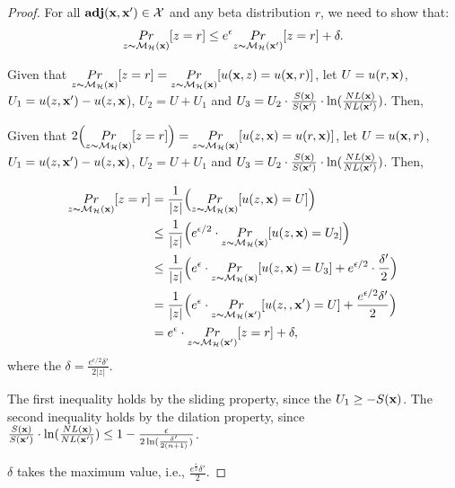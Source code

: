 \documentclass{article}
\begin{document}
\begin{proof}

For all $\textbf{adj}(\textbf{x},\textbf{x}') \in \mathcal{X}$ and any beta distribution $r$, we need to show that:
\begin{equation*}
\underset{z \thicksim \mathcal{M}_{\mathcal{H}}(\textbf{x})}{Pr}[ z = r] \leq e^{\epsilon} \underset{z \thicksim \mathcal{M}_{\mathcal{H}}(\textbf{x}')}{Pr}[z = r] + \delta. 
\end{equation*}


	Given that $\underset{z \thicksim \mathcal{M}_{\mathcal{H}}(\textbf{x})}{Pr}[z = r] = \underset{z \thicksim \mathcal{M}_{\mathcal{H}}(\textbf{x})}{Pr}[u(\textbf{x},z) = u(\textbf{x},r)]$, let $U = u(r, \textbf{x})$, $U_1 = u(z, \textbf{x}') - u(z, \textbf{x}$), $U_2 = U + U_1$ and $U_3 = U_2 \cdot \frac{S(\textbf{x})}{S(\textbf{x}')} \cdot \ln(\frac{NL(\textbf{x})}{NL(\textbf{x}')})$. Then,


	Given that $2\Big( \underset{z \thicksim \mathcal{M}_{\mathcal{H}}(\textbf{x})}{Pr}[z = r]\Big) = \underset{z \thicksim \mathcal{M}_{\mathcal{H}}(\textbf{x})}{Pr}[ u(z, \textbf{x}) = u(r, \textbf{x})]$, let $U = u(\textbf{x},r)$, $U_1 = u(z, \textbf{x}') - u(z, \textbf{x})$, $U_2 = U + U_1$ and $U_3 = U_2 \cdot \frac{S(\textbf{x})}{S(\textbf{x}')} \cdot \ln(\frac{NL(\textbf{x})}{NL(\textbf{x}')})$. Then,

	\begin{equation*}
	\begin{split}
	\underset{z \thicksim \mathcal{M}_{\mathcal{H}}(\textbf{x})}{Pr}[ z = r]
	& = 	\frac{1}{|z|}\Big( \underset{z \thicksim \mathcal{M}_{\mathcal{H}}(\textbf{x})}{Pr}[ u(z, \textbf{x}) = U]\Big)\\
	& \leq 	\frac{1}{|z|}\Big( e^{\epsilon / 2} \cdot \underset{z \thicksim \mathcal{M}_{\mathcal{H}}(\textbf{x})}{Pr}[ u(z, \textbf{x}) = U_2]\Big)\\
	& \leq 	\frac{1}{|z|}\Big( e^{\epsilon} \cdot \underset{z \thicksim \mathcal{M}_{\mathcal{H}}(\textbf{x})}{Pr}[ u(z, \textbf{x}) = U_3] + e^{\epsilon/2} \cdot \frac{\delta'}{2}\Big)\\
	& = 	\frac{1}{|z|}\Big( e^{\epsilon} \cdot \underset{z \thicksim \mathcal{M}_{\mathcal{H}}(\textbf{x}')}{Pr}[ u(z,, \textbf{x}') = U] + \frac{e^{\epsilon/2} \delta'}{2}\Big) \\
	& = e^{\epsilon} \cdot \underset{z \thicksim \mathcal{M}_{\mathcal{H}}(\textbf{x}')}{Pr}[ z = r] + \delta,
	\end{split}
	\end{equation*}
	where the $\delta = \frac{e^{\epsilon/2} \delta'}{2|z|}$.

	The first inequality holds by the sliding property, since the $U_1 \geq -S(\textbf{x})$. The second inequality holds by the dilation property, since $\frac{S(\textbf{x})}{S(\textbf{x}')} \cdot \ln(\frac{NL(\textbf{x})}{NL(\textbf{x}')}) \leq 1 - \frac{\epsilon}{2 \ln (\frac{\delta'}{2 (n + 1)})}$.

 $\delta$ takes the maximum value, i.e., $\frac{e^{\frac{\epsilon}{2}} \delta'}{2}$.
\end{proof}
\end{document}
